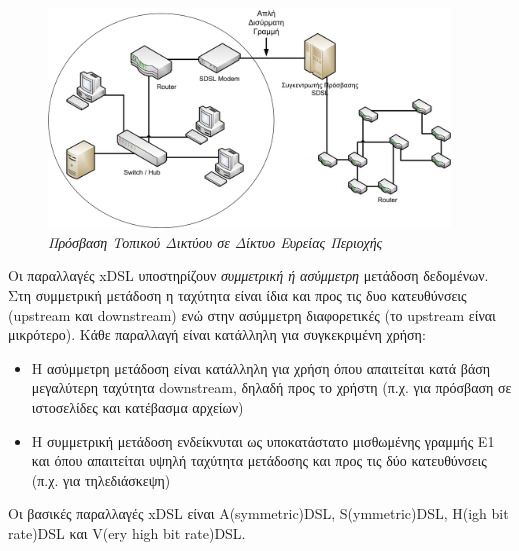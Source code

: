 \begin{figure}[!ht]
  \centering
  \includegraphics[width=0.95\textwidth]{images/chapter5/5-2}
  \caption {\textsl{Πρόσβαση Τοπικού Δικτύου σε Δίκτυο Ευρείας Περιοχής}}
  \label{5-2}
\end{figure}

Οι παραλλαγές xDSL υποστηρίζουν \emph{συμμετρική ή ασύμμετρη} μετάδοση δεδομένων. Στη συμμετρική μετάδοση η ταχύτητα είναι ίδια και προς τις δυο κατευθύνσεις (upstream και downstream) ενώ στην ασύμμετρη διαφορετικές (το upstream είναι μικρότερο).  Κάθε παραλλαγή είναι κατάλληλη για συγκεκριμένη χρήση:


\begin{itemize}
\item Η ασύμμετρη μετάδοση είναι κατάλληλη για χρήση όπου απαιτείται κατά βάση μεγαλύτερη ταχύτητα downstream, δηλαδή προς το χρήστη (π.χ. για πρόσβαση σε ιστοσελίδες και κατέβασμα αρχείων)
\item Η συμμετρική μετάδοση ενδείκνυται ως υποκατάστατο μισθωμένης γραμμής Ε1 και όπου απαιτείται υψηλή ταχύτητα μετάδοσης και προς τις δύο κατευθύνσεις (π.χ. για τηλεδιάσκεψη)
\end{itemize}
 
 Οι βασικές παραλλαγές xDSL είναι Α(symmetric)DSL, S(ymmetric)DSL, H(igh bit rate)DSL και V(ery high bit rate)DSL.
 
